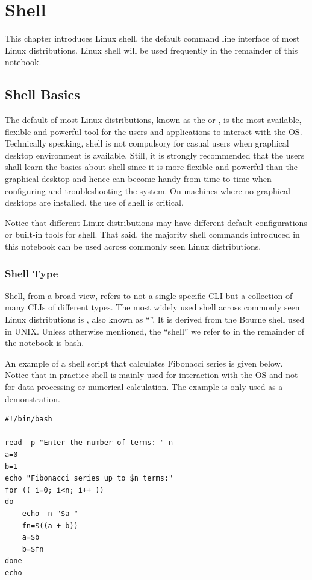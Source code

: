 \chapter{Shell} \label{ch:sb}

This chapter introduces Linux shell, the default command line interface of most Linux distributions. Linux shell will be used frequently in the remainder of this notebook.

\section{Shell Basics}

The default  of most Linux distributions, known as the  or , is the most available, flexible and powerful tool for the users and applications to interact with the OS. Technically speaking, shell is not compulsory for casual users when graphical desktop environment is available. Still, it is strongly recommended that the users shall learn the basics about shell since it is more flexible and powerful than the graphical desktop and hence can become handy from time to time when configuring and troubleshooting the system. On machines where no graphical desktops are installed, the use of shell is critical.

Notice that different Linux distributions may have different default configurations or built-in tools for shell. That said, the majority shell commands introduced in this notebook can be used across commonly seen Linux distributions.

\subsection{Shell Type}

Shell, from a broad view, refers to not a single specific CLI but a collection of many CLIs of different types. The most widely used shell across commonly seen Linux distributions is , also known as ``''. It is derived from the Bourne shell used in UNIX. Unless otherwise mentioned, the ``shell'' we refer to in the remainder of the notebook is bash. 

An example of a shell script that calculates Fibonacci series is given below. Notice that in practice shell is mainly used for interaction with the OS and not for data processing or numerical calculation. The example is only used as a demonstration.

\begin{lstlisting}
#!/bin/bash

read -p "Enter the number of terms: " n
a=0
b=1
echo "Fibonacci series up to $n terms:"
for (( i=0; i<n; i++ ))
do
    echo -n "$a "
    fn=$((a + b))
    a=$b
    b=$fn
done
echo
\end{lstlisting}

